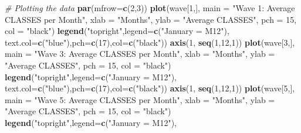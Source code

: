 \documentclass[
]{book}
\newenvironment{Shaded}{\begin{snugshade}}{\end{snugshade}}
\newcommand{\CommentTok}[1]{\textcolor[rgb]{0.56,0.35,0.01}{\textit{#1}}}
\newcommand{\DataTypeTok}[1]{\textcolor[rgb]{0.13,0.29,0.53}{#1}}
\newcommand{\DecValTok}[1]{\textcolor[rgb]{0.00,0.00,0.81}{#1}}
\newcommand{\KeywordTok}[1]{\textcolor[rgb]{0.13,0.29,0.53}{\textbf{#1}}}
\newcommand{\NormalTok}[1]{#1}
\newcommand{\StringTok}[1]{\textcolor[rgb]{0.31,0.60,0.02}{#1}}
\begin{document}
\begin{Shaded}
\begin{Highlighting}[]
\CommentTok{# Plotting the data}
\KeywordTok{par}\NormalTok{(}\DataTypeTok{mfrow=}\KeywordTok{c}\NormalTok{(}\DecValTok{2}\NormalTok{,}\DecValTok{3}\NormalTok{))}
\KeywordTok{plot}\NormalTok{(wave[}\DecValTok{1}\NormalTok{,],}
     \DataTypeTok{main =} \StringTok{"Wave 1: Average CLASSES per Month"}\NormalTok{,}
     \DataTypeTok{xlab =} \StringTok{"Months"}\NormalTok{,}
     \DataTypeTok{ylab =} \StringTok{"Average CLASSES"}\NormalTok{,}
     \DataTypeTok{pch =} \DecValTok{15}\NormalTok{,}
     \DataTypeTok{col =} \StringTok{"black"}\NormalTok{)}
\KeywordTok{legend}\NormalTok{(}\StringTok{"topright"}\NormalTok{,}\DataTypeTok{legend=}\KeywordTok{c}\NormalTok{(}\StringTok{"January = M12"}\NormalTok{),}
       \DataTypeTok{text.col=}\KeywordTok{c}\NormalTok{(}\StringTok{"blue"}\NormalTok{),}\DataTypeTok{pch=}\KeywordTok{c}\NormalTok{(}\DecValTok{17}\NormalTok{),}\DataTypeTok{col=}\KeywordTok{c}\NormalTok{(}\StringTok{"black"}\NormalTok{))}
\KeywordTok{axis}\NormalTok{(}\DecValTok{1}\NormalTok{, }\KeywordTok{seq}\NormalTok{(}\DecValTok{1}\NormalTok{,}\DecValTok{12}\NormalTok{,}\DecValTok{1}\NormalTok{))}
\KeywordTok{plot}\NormalTok{(wave[}\DecValTok{3}\NormalTok{,],}
     \DataTypeTok{main =} \StringTok{"Wave 3: Average CLASSES per Month"}\NormalTok{,}
     \DataTypeTok{xlab =} \StringTok{"Months"}\NormalTok{,}
     \DataTypeTok{ylab =} \StringTok{"Average CLASSES"}\NormalTok{,}
     \DataTypeTok{pch =} \DecValTok{15}\NormalTok{,}
     \DataTypeTok{col =} \StringTok{"black"}\NormalTok{)}
\KeywordTok{legend}\NormalTok{(}\StringTok{"topright"}\NormalTok{,}\DataTypeTok{legend=}\KeywordTok{c}\NormalTok{(}\StringTok{"January = M12"}\NormalTok{),}
       \DataTypeTok{text.col=}\KeywordTok{c}\NormalTok{(}\StringTok{"blue"}\NormalTok{),}\DataTypeTok{pch=}\KeywordTok{c}\NormalTok{(}\DecValTok{17}\NormalTok{),}\DataTypeTok{col=}\KeywordTok{c}\NormalTok{(}\StringTok{"black"}\NormalTok{))}
\KeywordTok{axis}\NormalTok{(}\DecValTok{1}\NormalTok{, }\KeywordTok{seq}\NormalTok{(}\DecValTok{1}\NormalTok{,}\DecValTok{12}\NormalTok{,}\DecValTok{1}\NormalTok{))}
\KeywordTok{plot}\NormalTok{(wave[}\DecValTok{5}\NormalTok{,],}
     \DataTypeTok{main =} \StringTok{"Wave 5: Average CLASSES per Month"}\NormalTok{,}
     \DataTypeTok{xlab =} \StringTok{"Months"}\NormalTok{,}
     \DataTypeTok{ylab =} \StringTok{"Average CLASSES"}\NormalTok{,}
     \DataTypeTok{pch =} \DecValTok{15}\NormalTok{,}
     \DataTypeTok{col =} \StringTok{"black"}\NormalTok{)}
\KeywordTok{legend}\NormalTok{(}\StringTok{"topright"}\NormalTok{,}\DataTypeTok{legend=}\KeywordTok{c}\NormalTok{(}\StringTok{"January = M12"}\NormalTok{),}

\end{Highlighting}
\end{Shaded}
\end{document}
